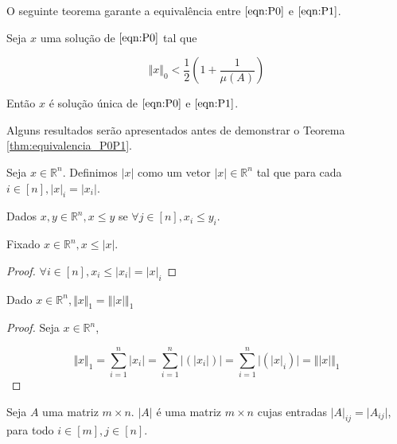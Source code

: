 O seguinte teorema garante a equivalência entre $\eqref{eqn:P0}$ e $\eqref{eqn:P1}$.

\begin{teorema}
Seja $x$ uma solução de $\eqref{eqn:P0}$ tal que

$$ \Vert x \Vert_0 < \frac{1}{2} \left(1 + \frac{1}{\mu(A)}\right) $$

Então $x$ é solução única de $\eqref{eqn:P0}$ e $\eqref{eqn:P1}$.
\label{thm:equivalencia_P0P1}
\end{teorema}

Alguns resultados serão apresentados antes de demonstrar o Teorema \ref{thm:equivalencia_P0P1}.

\begin{definicao}
Seja $x \in \mathbb{R}^n$. Definimos $\vert x \vert$ como um vetor $\vert x \vert \in \mathbb{R}^n$ tal que para cada $i \in [n], \vert x \vert_i = \vert x_i \vert$.
\end{definicao}

\begin{definicao}
Dados $x, y \in \mathbb{R}^n, x \leq y$ se $\forall j \in [n], x_i \leq y_i$.
\end{definicao}

\begin{lema}
Fixado $x \in \mathbb{R}^n, x \leq \vert x \vert$.
\end{lema}
\begin{proof}
$ \forall i \in [n], x_i \leq \vert x_i \vert = \vert x \vert_i$
\end{proof}

\begin{lema} %
Dado $x \in \mathbb{R}^n, \Vert x \Vert_1 = \Vert \vert x \vert \Vert_1$
\end{lema}
\begin{proof}
Seja $x \in \mathbb{R}^n$,

$$\Vert x \Vert_1 = \sum_{i = 1}^n \vert x_i \vert = \sum_{i = 1}^n \vert (\vert x_i \vert) \vert
= \sum_{i = 1}^n \vert (\vert x \vert_i) \vert = \Vert \vert x \vert \Vert_1$$
\end{proof}

\begin{definicao}
Seja $A$ uma matriz $m \times n$. $\vert A \vert$ é uma matriz $m \times n$ cujas entradas $\vert A \vert_{ij} = \vert A_{ij} \vert$, para todo $i \in [m], j \in [n]$.
\end{definicao}

